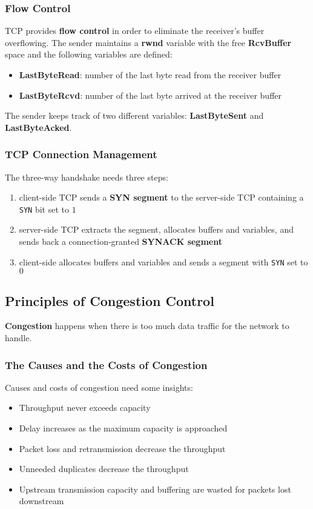 \documentclass{article}
\begin{document}
\subsubsection{Flow Control}
TCP provides \textbf{flow control} in order to eliminate the receiver's buffer overflowing. The sender maintains a \textbf{rwnd} variable with the free \textbf{RcvBuffer} space and the following variables are defined:
\begin{itemize}
    \item \textbf{LastByteRead}: number of the last byte read from the receiver buffer
    \item \textbf{LastByteRcvd}: number of the last byte arrived at the receiver buffer
\end{itemize}
The sender keeps track of two different variables: \textbf{LastByteSent} and \textbf{LastByteAcked}.
\subsubsection{TCP Connection Management}
The three-way handshake needs three steps:
\begin{enumerate}
    \item client-side TCP sends a \textbf{SYN segment} to the server-side TCP containing a \verb|SYN| bit set to $1$
    \item server-side TCP extracts the segment, allocates buffers and variables, and sends back a connection-granted \textbf{SYNACK segment}
    \item client-side allocates buffers and variables and sends a segment with \verb|SYN| set to $0$
\end{enumerate}

\subsection{Principles of Congestion Control}
\textbf{Congestion} happens when there is too much data traffic for the network to handle.
\subsubsection{The Causes and the Costs of Congestion}
Causes and costs of congestion need some insights:
\begin{itemize}
    \item Throughput never exceeds capacity
    \item Delay increases as the maximum capacity is approached
    \item Packet loss and retransmission decrease the throughput
    \item Unneeded duplicates decrease the throughput
    \item Upstream transmission capacity and buffering are wasted for packets lost downstream
\end{itemize}
\end{document}
